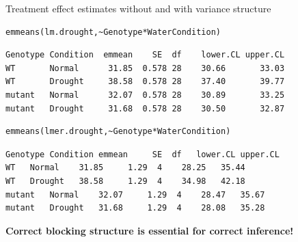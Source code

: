 \documentclass{beamer}
\makeatletter
\newenvironment{kframe}{%
 \def\at@end@of@kframe{}%
 \ifinner\ifhmode%
  \def\at@end@of@kframe{\end{minipage}}%
  \begin{minipage}{\columnwidth}%
 \fi\fi%
 \def\FrameCommand##1{\hskip\@totalleftmargin \hskip-\fboxsep
 \colorbox{shadecolor}{##1}\hskip-\fboxsep
     \hskip-\linewidth \hskip-\@totalleftmargin \hskip\columnwidth}%
 \MakeFramed {\advance\hsize-\width
   \@totalleftmargin\z@ \linewidth\hsize
   \@setminipage}}%
 {\par\unskip\endMakeFramed%
 \at@end@of@kframe}
\newenvironment{knitrout}{}{} %
\makeatother
\begin{document}
\begin{frame}[fragile]{Treatment effect estimates without and with variance structure}
   \begin{knitrout}
 \footnotesize
{}\color{fgcolor}\begin{kframe}
\begin{verbatim}
emmeans(lm.drought,~Genotype*WaterCondition) 
\end{verbatim}
\end{kframe}
\end{knitrout}

  \begin{knitrout}
 \footnotesize
{}\color{fgcolor}\begin{kframe}
\begin{verbatim}
Genotype Condition  emmean    SE  df 	lower.CL upper.CL 
WT       Normal      31.85  0.578 28 	30.66 		33.03 
WT       Drought     38.58  0.578 28 	37.40 		39.77 
mutant   Normal      32.07  0.578 28 	30.89 		33.25 
mutant   Drought     31.68  0.578 28 	30.50 		32.87 
\end{verbatim}
\end{kframe}
\end{knitrout}


   \begin{knitrout}
 \footnotesize
{}\color{fgcolor}\begin{kframe}
\begin{verbatim}
emmeans(lmer.drought,~Genotype*WaterCondition)
\end{verbatim}
\end{kframe}
\end{knitrout}

  \begin{knitrout}
 \footnotesize
{}\color{fgcolor}\begin{kframe}
\begin{verbatim}
Genotype Condition emmean     SE  df   lower.CL upper.CL 
WT 	 Normal    31.85     1.29  4    28.25 	35.44 
WT 	 Drought   38.58     1.29  4    34.98 	42.18
mutant   Normal    32.07     1.29  4    28.47 	35.67  
mutant   Drought   31.68     1.29  4    28.08 	35.28
\end{verbatim}
\end{kframe}
\end{knitrout}

 \textbf{Correct blocking structure is essential for correct inference!}
\end{frame}
\end{document}
